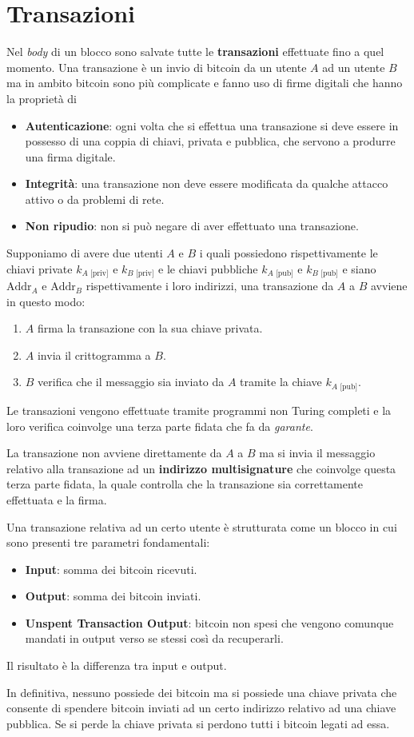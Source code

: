 \section{Transazioni}
Nel \emph{body} di un blocco sono salvate tutte le \textbf{transazioni} effettuate fino a quel momento. Una transazione
\`e un invio di bitcoin da un utente $A$ ad un utente $B$ ma in ambito bitcoin sono pi\`u complicate e fanno uso di
firme digitali che hanno la propriet\`a di
\begin{itemize}
	\item \textbf{Autenticazione}: ogni volta che si effettua una transazione si deve essere in possesso di una coppia
	      di chiavi, privata e pubblica, che servono a produrre una firma digitale.
	\item \textbf{Integrit\`a}: una transazione non deve essere modificata da qualche attacco attivo o da problemi di
	      rete.
	\item \textbf{Non ripudio}: non si pu\`o negare di aver effettuato una transazione.
\end{itemize}
Supponiamo di avere due utenti $A$ e $B$ i quali possiedono rispettivamente le chiavi private $k_{A\text{ [priv]}}$ e
$k_{B\text{ [priv]}}$ e le chiavi pubbliche $k_{A\text{ [pub]}}$ e $k_{B\text{ [pub]}}$ e siano $\text{Addr}_A$ e
$\text{Addr}_B$ rispettivamente i loro indirizzi, una transazione da $A$ a $B$ avviene in questo modo:
\begin{enumerate}
	\item $A$ firma la transazione con la sua chiave privata.
	\item $A$ invia il crittogramma a $B$.
	\item $B$ verifica che il messaggio sia inviato da $A$ tramite la chiave $k_{A\text{ [pub]}}$.
\end{enumerate}
Le transazioni vengono effettuate tramite programmi non Turing completi e la loro verifica coinvolge una terza parte
fidata che fa da \emph{garante}.

La transazione non avviene direttamente da $A$ a $B$ ma si invia il messaggio relativo alla transazione ad un
\textbf{indirizzo multisignature} che coinvolge questa terza parte fidata, la quale controlla che la transazione
sia correttamente effettuata e la firma.

Una transazione relativa ad un certo utente \`e strutturata come un blocco in cui sono presenti tre parametri
fondamentali:
\begin{itemize}
	\item \textbf{Input}: somma dei bitcoin ricevuti.
	\item \textbf{Output}: somma dei bitcoin inviati.
	\item \textbf{Unspent Transaction Output}: bitcoin non spesi che vengono comunque mandati in output verso se stessi
	      cos\`i da recuperarli.
\end{itemize}
Il risultato \`e la differenza tra input e output.

In definitiva, nessuno possiede dei bitcoin ma si possiede una chiave privata che consente di spendere bitcoin inviati
ad un certo indirizzo relativo ad una chiave pubblica. Se si perde la chiave privata si perdono tutti i bitcoin legati
ad essa.

